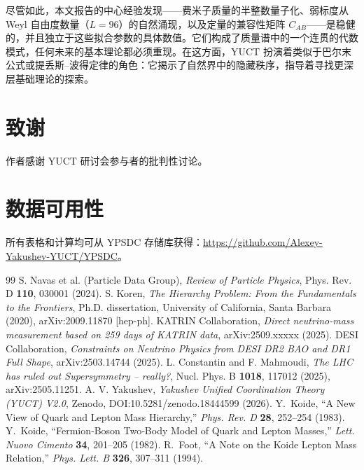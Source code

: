 \documentclass[11pt,a4paper]{article}
\begin{document}
	尽管如此，本文报告的中心经验发现——费米子质量的半整数量子化、弱标度从 Weyl 自由度数量（\(L=96\)）的自然涌现，以及定量的兼容性矩阵 \(C_{AB}\)——是稳健的，并且独立于这些拟合参数的具体数值。它们构成了质量谱中的一个连贯的代数模式，任何未来的基本理论都必须重现。在这方面，YUCT 扮演着类似于巴尔末公式或提丢斯–波得定律的角色：它揭示了自然界中的隐藏秩序，指导着寻找更深层基础理论的探索。
	
	\section*{致谢}
	作者感谢 YUCT 研讨会参与者的批判性讨论。
	
	\section*{数据可用性}
	所有表格和计算均可从 YPSDC 存储库获得：\url{https://github.com/Alexey-Yakushev-YUCT/YPSDC}。
	
	\begin{thebibliography}{99}
		 S. Navas et al. (Particle Data Group), \emph{Review of Particle Physics}, Phys. Rev. D \textbf{110}, 030001 (2024).
		 S. Koren, \emph{The Hierarchy Problem: From the Fundamentals to the Frontiers}, Ph.D. dissertation, University of California, Santa Barbara (2020), arXiv:2009.11870 [hep-ph].
		 KATRIN Collaboration, \emph{Direct neutrino-mass measurement based on 259 days of KATRIN data}, arXiv:2509.xxxxx (2025).
		 DESI Collaboration, \emph{Constraints on Neutrino Physics from DESI DR2 BAO and DR1 Full Shape}, arXiv:2503.14744 (2025).
		 L. Constantin and F. Mahmoudi, \emph{The LHC has ruled out Supersymmetry -- really?}, Nucl. Phys. B \textbf{1018}, 117012 (2025), arXiv:2505.11251.
		 A. V. Yakushev, \emph{Yakushev Unified Coordination Theory (YUCT) V2.0}, Zenodo, DOI:10.5281/zenodo.18444599 (2026).
		 Y.~Koide, ``A New View of Quark and Lepton Mass Hierarchy,''
		\emph{Phys. Rev. D} \textbf{28}, 252--254 (1983).
		 Y.~Koide, ``Fermion‑Boson Two‑Body Model of Quark and Lepton Masses,''
		\emph{Lett. Nuovo Cimento} \textbf{34}, 201--205 (1982).
		 R.~Foot, ``A Note on the Koide Lepton Mass Relation,''
		\emph{Phys. Lett. B} \textbf{326}, 307--311 (1994).
	\end{thebibliography}
	
\end{document}
